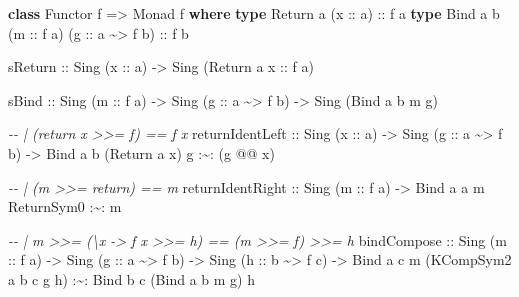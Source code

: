 \documentclass[]{article}
\newenvironment{Shaded}{}{}
\newcommand{\CommentTok}[1]{\textcolor[rgb]{0.38,0.63,0.69}{\textit{#1}}}
\newcommand{\DataTypeTok}[1]{\textcolor[rgb]{0.56,0.13,0.00}{#1}}
\newcommand{\KeywordTok}[1]{\textcolor[rgb]{0.00,0.44,0.13}{\textbf{#1}}}
\newcommand{\NormalTok}[1]{#1}
\newcommand{\OperatorTok}[1]{\textcolor[rgb]{0.40,0.40,0.40}{#1}}
\newcommand{\OtherTok}[1]{\textcolor[rgb]{0.00,0.44,0.13}{#1}}
\begin{document}
\begin{Shaded}
\begin{Highlighting}[]
\KeywordTok{class} \DataTypeTok{Functor}\NormalTok{ f }\OtherTok{=\textgreater{}} \DataTypeTok{Monad}\NormalTok{ f }\KeywordTok{where}
    \KeywordTok{type} \DataTypeTok{Return}\NormalTok{ a   (}\OtherTok{x ::}\NormalTok{ a)}\OtherTok{                   ::}\NormalTok{ f a}
    \KeywordTok{type} \DataTypeTok{Bind}\NormalTok{   a b (}\OtherTok{m ::}\NormalTok{ f a) (}\OtherTok{g ::}\NormalTok{ a }\OperatorTok{\textasciitilde{}\textgreater{}}\NormalTok{ f b)}\OtherTok{ ::}\NormalTok{ f b}

\NormalTok{    sReturn}
\OtherTok{        ::} \DataTypeTok{Sing}\NormalTok{ (}\OtherTok{x ::}\NormalTok{ a)}
        \OtherTok{{-}\textgreater{}} \DataTypeTok{Sing}\NormalTok{ (}\DataTypeTok{Return}\NormalTok{ a}\OtherTok{ x ::}\NormalTok{ f a)}

\NormalTok{    sBind}
\OtherTok{        ::} \DataTypeTok{Sing}\NormalTok{ (}\OtherTok{m ::}\NormalTok{ f a)}
        \OtherTok{{-}\textgreater{}} \DataTypeTok{Sing}\NormalTok{ (}\OtherTok{g ::}\NormalTok{ a }\OperatorTok{\textasciitilde{}\textgreater{}}\NormalTok{ f b)}
        \OtherTok{{-}\textgreater{}} \DataTypeTok{Sing}\NormalTok{ (}\DataTypeTok{Bind}\NormalTok{ a b m g)}

    \CommentTok{{-}{-} | (return x \textgreater{}\textgreater{}= f) == f x}
\NormalTok{    returnIdentLeft}
\OtherTok{        ::} \DataTypeTok{Sing}\NormalTok{ (}\OtherTok{x ::}\NormalTok{ a)}
        \OtherTok{{-}\textgreater{}} \DataTypeTok{Sing}\NormalTok{ (}\OtherTok{g ::}\NormalTok{ a }\OperatorTok{\textasciitilde{}\textgreater{}}\NormalTok{ f b)}
        \OtherTok{{-}\textgreater{}} \DataTypeTok{Bind}\NormalTok{ a b (}\DataTypeTok{Return}\NormalTok{ a x) g }\OperatorTok{:\textasciitilde{}:}\NormalTok{ (g }\OperatorTok{@@}\NormalTok{ x)}

    \CommentTok{{-}{-} | (m \textgreater{}\textgreater{}= return) == m}
\NormalTok{    returnIdentRight}
\OtherTok{        ::} \DataTypeTok{Sing}\NormalTok{ (}\OtherTok{m ::}\NormalTok{ f a)}
        \OtherTok{{-}\textgreater{}} \DataTypeTok{Bind}\NormalTok{ a a m }\DataTypeTok{ReturnSym0} \OperatorTok{:\textasciitilde{}:}\NormalTok{ m}

    \CommentTok{{-}{-} | m \textgreater{}\textgreater{}= (\textbackslash{}x {-}\textgreater{} f x \textgreater{}\textgreater{}= h) == (m \textgreater{}\textgreater{}= f) \textgreater{}\textgreater{}= h}
\NormalTok{    bindCompose}
\OtherTok{        ::} \DataTypeTok{Sing}\NormalTok{ (}\OtherTok{m ::}\NormalTok{ f a)}
        \OtherTok{{-}\textgreater{}} \DataTypeTok{Sing}\NormalTok{ (}\OtherTok{g ::}\NormalTok{ a }\OperatorTok{\textasciitilde{}\textgreater{}}\NormalTok{ f b)}
        \OtherTok{{-}\textgreater{}} \DataTypeTok{Sing}\NormalTok{ (}\OtherTok{h ::}\NormalTok{ b }\OperatorTok{\textasciitilde{}\textgreater{}}\NormalTok{ f c)}
        \OtherTok{{-}\textgreater{}} \DataTypeTok{Bind}\NormalTok{ a c m (}\DataTypeTok{KCompSym2}\NormalTok{ a b c g h) }\OperatorTok{:\textasciitilde{}:} \DataTypeTok{Bind}\NormalTok{ b c (}\DataTypeTok{Bind}\NormalTok{ a b m g) h}


\end{Highlighting}
\end{Shaded}
\end{document}
